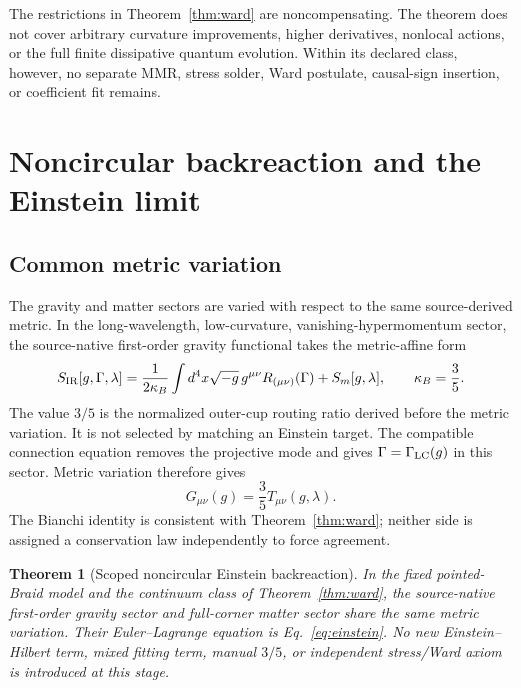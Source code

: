 \documentclass[11pt]{article}
\newtheorem{theorem}{Theorem}[section]
\theoremstyle{definition}
\theoremstyle{remark}
\begin{document}
The restrictions in Theorem~\ref{thm:ward} are noncompensating. The theorem does not cover arbitrary curvature improvements, higher derivatives, nonlocal actions, or the full finite dissipative quantum evolution. Within its declared class, however, no separate MMR, stress solder, Ward postulate, causal-sign insertion, or coefficient fit remains.

\section{Noncircular backreaction and the Einstein limit}

\subsection{Common metric variation}

The gravity and matter sectors are varied with respect to the same source-derived metric. In the long-wavelength, low-curvature, vanishing-hypermomentum sector, the source-native first-order gravity functional takes the metric-affine form
\begin{equation}\label{eq:sir}
 S_{\rm IR}[g,\Gamma,\lambda]
 =\frac{1}{2\kappa_B}\int d^4x\sqrt{-g}\,
 g^{\mu\nu}R_{(\mu\nu)}(\Gamma)
 +S_m[g,\lambda],
 \qquad \kappa_B=\frac35.
\end{equation}
The value $3/5$ is the normalized outer-cup routing ratio derived before the metric variation. It is not selected by matching an Einstein target. The compatible connection equation removes the projective mode and gives $\Gamma=\Gamma_{\rm LC}(g)$ in this sector. Metric variation therefore gives
\begin{equation}\label{eq:einstein}
 \boxed{G_{\mu\nu}(g)=\frac35T_{\mu\nu}(g,\lambda)}.
\end{equation}
The Bianchi identity is consistent with Theorem~\ref{thm:ward}; neither side is assigned a conservation law independently to force agreement.

\begin{theorem}[Scoped noncircular Einstein backreaction]\label{thm:einstein}
In the fixed pointed-Braid model and the continuum class of Theorem~\ref{thm:ward}, the source-native first-order gravity sector and full-corner matter sector share the same metric variation. Their Euler--Lagrange equation is Eq.~\eqref{eq:einstein}. No new Einstein--Hilbert term, mixed fitting term, manual $3/5$, or independent stress/Ward axiom is introduced at this stage.
\end{theorem}
\end{document}
